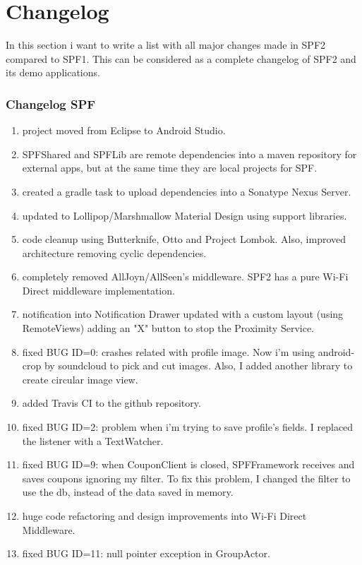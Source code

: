 \chapter{Changelog}
\label{changelog}

In this section i want to write a list with all major changes made in SPF2 compared to SPF1. This can be considered as a complete changelog of SPF2 and its demo applications.

\subsection*{Changelog SPF}
\begin{enumerate}
	\item project moved from Eclipse to Android Studio.
	\item SPFShared and SPFLib are remote dependencies into a maven repository for external apps, but at the same time they are local projects for SPF.
	\item created a gradle task to upload dependencies into a Sonatype Nexus Server.
	\item updated to Lollipop/Marshmallow Material Design using support libraries.
	\item code cleanup using Butterknife, Otto and Project Lombok. Also, improved architecture removing cyclic dependencies.
	\item completely removed AllJoyn/AllSeen's middleware. SPF2 has a pure Wi-Fi Direct middleware implementation.
	\item notification into Notification Drawer updated with a custom layout (using RemoteViews) adding an "X" button to stop the Proximity Service.
	\item fixed BUG ID=0: crashes related with profile image. Now i'm using android-crop by soundcloud to pick and cut images. Also, I added another library to create circular image view.
	\item added Travis CI to the github repository.
	\item fixed BUG ID=2: problem when i'm trying to save profile's fields. I replaced the listener with a \textsf{TextWatcher}.
	\item fixed BUG ID=9: when CouponClient is closed, SPFFramework receives and saves coupons ignoring my filter. To fix this problem, I changed the filter to use the db, instead of the data saved in memory.
	\item huge code refactoring and design improvements into Wi-Fi Direct Middleware.
	\item fixed BUG ID=11: null pointer exception in GroupActor.

\end{enumerate}

